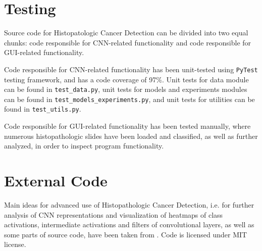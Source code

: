 \section{Testing}
\label{tests}

Source code for Histopatologic Cancer Detection can be divided into two equal chunks: code responsible for CNN-related functionality and code responsible for GUI-related functionality.

Code responsible for CNN-related functionality has been unit-tested using \texttt{PyTest} testing framework, and has a code coverage of 97\%. Unit tests for data module can be found in \texttt{test\_data.py}, unit tests for models and experiments modules can be found in \texttt{test\_models\_experiments.py}, and unit tests for utilities can be found in \texttt{test\_utils.py}.

Code responsible for GUI-related functionality has been tested manually, where numerous histopathologic slides have been loaded and classified, as well as further analyzed, in order to inspect program functionality. 

\section{External Code}

Main ideas for advanced use of Histopathologic Cancer Detection, i.e. for further analysis of CNN representations and visualization of heatmaps of class activations, intermediate activations and filters of convolutional layers, as well as some parts of source code, have been taken from \cite{chollet2018deep}. Code is licensed under MIT license.